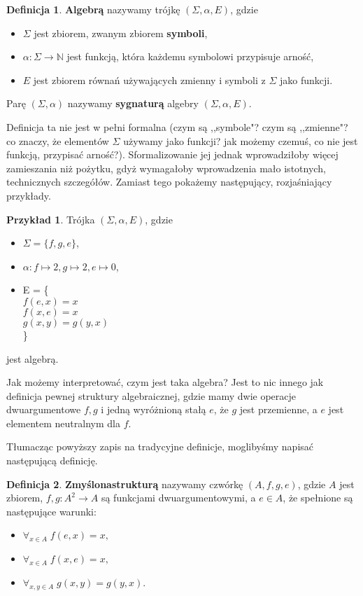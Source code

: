 \documentclass{article}
\theoremstyle{definition}
\newtheorem{definition}{Definicja}[section]
\newtheorem{example}{Przykład}[section]
\begin{document}
\begin{definition}
	\textbf{Algebrą} nazywamy trójkę $(\Sigma, \alpha, E)$,
	gdzie
	\begin{itemize}
		\item $\Sigma$ jest zbiorem, zwanym zbiorem \textbf{symboli},
		\item $\alpha: \Sigma \to \mathbb{N}$ jest funkcją, która każdemu symbolowi przypisuje arność,
		\item $E$ jest zbiorem równań używających zmienny i symboli z $\Sigma$ jako funkcji.
	\end{itemize}
	Parę $(\Sigma, \alpha)$ nazywamy \textbf{sygnaturą} algebry $(\Sigma, \alpha, E)$.
\end{definition}

Definicja ta nie jest w pełni formalna (czym są ,,symbole"? czym są ,,zmienne"? co znaczy, że elementów $\Sigma$ używamy jako funkcji? jak możemy czemuś, co nie jest funkcją, przypisać arność?).
Sformalizowanie jej jednak wprowadziłoby więcej zamieszania niż pożytku,
gdyż wymagałoby wprowadzenia mało istotnych, technicznych szczegółów.
Zamiast tego pokażemy następujący,
rozjaśniający przykłady.

\begin{example}
	Trójka $(\Sigma, \alpha, E)$, gdzie
	\begin{itemize}
		\item $\Sigma = \{f, g, e\}$,
		\item $\alpha: f \mapsto 2, g \mapsto 2, e \mapsto 0$,
		\item E = \{\\
		      $f(e, x) = x$ \\
		      $f(x, e) = x$ \\
		      $g(x, y) = g(y, x)$ \\
		      \}
	\end{itemize}
	jest algebrą.
\end{example}
Jak możemy interpretować, czym jest taka algebra?
Jest to nic innego jak definicja pewnej struktury algebraicznej,
gdzie mamy dwie operacje dwuargumentowe $f, g$ i jedną wyróżnioną stałą $e$,
że $g$ jest przemienne, a $e$ jest elementem neutralnym dla $f$.

Tłumacząc powyższy zapis na tradycyjne definicje, moglibyśmy napisać następującą definicję.
\begin{definition}
	\textbf{Zmyślonastrukturą} nazywamy czwórkę $(A, f, g, e)$, gdzie $A$ jest zbiorem, $f, g: A^2 \to A$ są funkcjami dwuargumentowymi, a $e \in A$, że spełnione są następujące warunki:
	\begin{itemize}
		\item $\forall_{x\in A}\; f(e, x) = x,$
		\item $\forall_{x\in A}\; f(x, e) = x,$
		\item $\forall_{x,y\in A}\; g(x, y) = g(y, x).$
	\end{itemize}
\end{definition}
\end{document}
